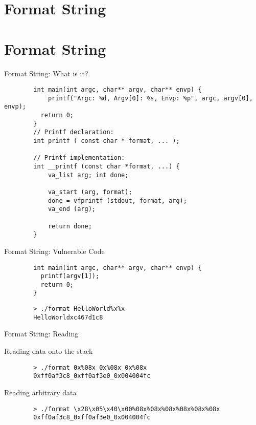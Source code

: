 \section{Format String}

\section{Format String}
\begin{frame}[fragile]{Format String: What is it?}
	\ccode
	\begin{lstlisting}
		int main(int argc, char** argv, char** envp) {
			printf("Argc: %d, Argv[0]: %s, Envp: %p", argc, argv[0], envp);
		  return 0;
		}
		// Printf declaration:
		int printf ( const char * format, ... );

		// Printf implementation:
		int __printf (const char *format, ...) {
			va_list arg; int done;
		
			va_start (arg, format);
			done = vfprintf (stdout, format, arg);
			va_end (arg);
		
			return done;
		}
	\end{lstlisting}
\end{frame}

\begin{frame}[fragile]{Format String: Vulnerable Code}
	\ccode
	\begin{lstlisting}
		int main(int argc, char** argv, char** envp) {
		  printf(argv[1]);
		  return 0;
		}
	\end{lstlisting}

	\begin{lstlisting}
		> ./format HelloWorld%x%x
		HelloWorldxc467d1c8
	\end{lstlisting}

\end{frame}

\begin{frame}[fragile]{Format String: Reading}
	\begin{block}{Reading data onto the stack}
		\begin{lstlisting}
		> ./format 0x%08x_0x%08x_0x%08x
		0xff0af3c8_0xff0af3e0_0x004004fc
		\end{lstlisting}
	\end{block}

	\begin{block}{Reading arbitrary data}
		\begin{lstlisting}
		> ./format \x28\x05\x40\x00%08x%08x%08x%08x%08x%08x
		0xff0af3c8_0xff0af3e0_0x004004fc
		\end{lstlisting}
	\end{block}
\end{frame}
